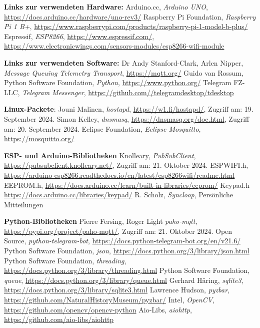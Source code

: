 \documentclass[12pt, letterpaper]{article}
\begin{document}
\begin{thebibliography}{20}
  \par \textbf{Links zur verwendeten Hardware:}
  Arduino.cc, \textit{Arduino UNO}, \url{https://docs.arduino.cc/hardware/uno-rev3/}
  Raspberry Pi Foundation, \textit{Raspberry Pi 1 B+}, \url{https://www.raspberrypi.com/products/raspberry-pi-1-model-b-plus/}
  Espressif, \textit{ESP8266}, \url{https://www.espressif.com/}, \url{https://www.electronicwings.com/sensors-modules/esp8266-wifi-module}
  \par \textbf{Links zur verwendeten Software:}
  Dr Andy Stanford-Clark, Arlen Nipper, \textit{Message Queuing Telemetry Transport}, \url{https://mqtt.org/}
  Guido van Rossum, Python Software Foundation, \textit{Python}, \url{https://www.python.org/}
  Telegram FZ-LLC, \textit{Telegram Messenger}, \url{https://github.com//telegramdesktop/tdesktop}
  \par \textbf{Linux-Packete}:
  Jouni Malinen, \textit{hostapd}, \url{https://w1.fi/hostapd/}, Zugriff am: 19. September 2024.
  Simon Kelley, \textit{dnsmasq}, \url{https://dnsmasq.org/doc.html}, Zugriff am: 20. September 2024.
  Eclipse Foundation, \textit{Eclipse Mosquitto}, \url{https://mosquitto.org/}
  \par \textbf{ESP- und Arduino-Bibliotheken}
  Knolleary, \textit{PubSubClient}, \url{https://pubsubclient.knolleary.net/}, Zugriff am: 21. Oktober 2024.
  ESPWIFI.h, \url{https://arduino-esp8266.readthedocs.io/en/latest/esp8266wifi/readme.html}
  EEPROM.h, \url{https://docs.arduino.cc/learn/built-in-libraries/eeprom/}
  Keypad.h \url{https://docs.arduino.cc/libraries/keypad/}
  R. Scholz, \textit{Syncloop}, Persönliche Mitteilungen
  \par \textbf{Python-Bibliotheken}
  Pierre Fersing, Roger Light \textit{paho-mqtt}, \url{https://pypi.org/project/paho-mqtt/}, Zugriff am: 21. Oktober 2024.
  Open Source, \textit{python-telegram-bot}, \url{https://docs.python-telegram-bot.org/en/v21.6/}
  Python Software Foundation, \textit{json}, \url{https://docs.python.org/3/library/json.html}
  Python Software Foundation, \textit{threading}, \url{https://docs.python.org/3/library/threading.html}
  Python Software Foundation, \textit{queue}, \url{https://docs.python.org/3/library/queue.html}
  Gerhard Häring, \textit{sqlite3}, \url{https://docs.python.org/3/library/sqlite3.html}
  Lawrence Hudson, \textit{pyzbar}, \url{https://github.com/NaturalHistoryMuseum/pyzbar/}
  Intel, \textit{OpenCV}, \url{https://github.com/opencv/opencv-python}
  Aio-Libs, \textit{aiohttp}, \url{https://github.com/aio-libs/aiohttp}
\end{thebibliography}
\end{document}
